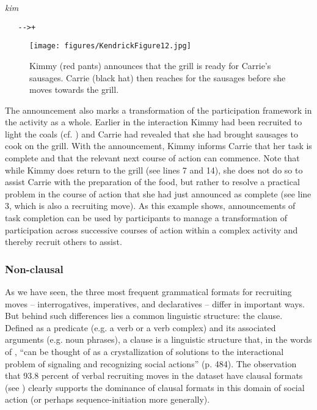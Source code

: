 \documentclass[output=paper,nonflat,modfont,draft]{langsci/langscibook}
\begin{document}
\begin{transbox}{14}{\textit{kim}}
\begin{verbatim}
   -->+
\end{verbatim}
\end{transbox}\bigskip

\begin{figure}
\caption{Kimmy (red pants) announces that the grill is ready for Carrie’s sausages. Carrie (black hat) then reaches for the sausages before she moves towards the grill. }
\texttt{[image: figures/KendrickFigure12.jpg]}
\end{figure}

The announcement also marks a transformation of the participation framework in the activity as a whole. Earlier in the interaction Kimmy had been recruited to light the coals (cf. ) and Carrie had revealed that she had brought sausages to cook on the grill. With the announcement, Kimmy informs Carrie that her task is complete and that the relevant next course of action can commence. Note that while Kimmy does return to the grill (see lines 7 and 14), she does not do so to assist Carrie with the preparation of the food, but rather to resolve a practical problem in the course of action that she had just announced as complete (see line 3, which is also a recruiting move). As this example shows, announcements of task completion can be used by participants to manage a transformation of participation across successive courses of action within a complex activity and thereby recruit others to assist.

\subsubsection{Non-clausal}\label{sec:kendrick:4.2.4}
As we have seen, the three most frequent grammatical formats for recruiting moves -- interrogatives, imperatives, and declaratives -- differ in important ways. But behind such differences lies a common linguistic structure: the clause. Defined as a predicate (e.g. a verb or a verb complex) and its associated arguments (e.g. noun phrases), a clause is a linguistic structure that, in the words of \citet{thompson_clause_2005}, “can be thought of as a crystallization of solutions to the interactional problem of signaling and recognizing social actions” (p. 484). The observation that 93.8 percent of verbal recruiting moves in the dataset have clausal formats (see ) clearly supports the dominance of clausal formats in this domain of social action (or perhaps sequence-initiation more generally).
\end{document}
